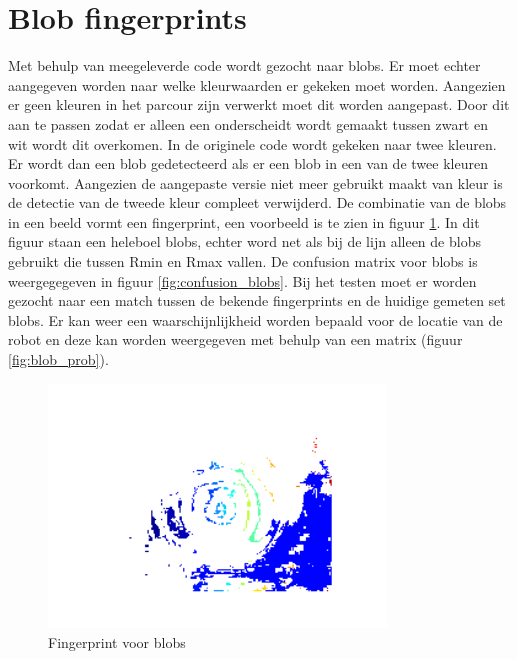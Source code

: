 \documentclass[a4paper]{article}
\begin{document}
\section{Blob fingerprints}
Met behulp van meegeleverde code wordt gezocht naar blobs. Er moet echter aangegeven worden naar welke kleurwaarden er gekeken moet worden. Aangezien er geen kleuren in het parcour zijn verwerkt moet dit worden aangepast. Door dit aan te passen zodat er alleen een onderscheidt wordt gemaakt tussen zwart en wit wordt dit overkomen. In de originele code wordt gekeken naar twee kleuren. Er wordt dan een blob gedetecteerd als er een blob in een van de twee kleuren voorkomt.  Aangezien de aangepaste versie niet meer gebruikt maakt van kleur is de detectie van de tweede kleur compleet verwijderd. 
De combinatie van de blobs in een beeld vormt een fingerprint, een voorbeeld is te zien in figuur \ref{fig:blobfinger}. In dit figuur staan een heleboel blobs, echter word net als bij de lijn alleen de blobs gebruikt die tussen Rmin en Rmax vallen. 
De confusion matrix voor blobs is weergegegeven in figuur \ref{fig:confusion_blobs}.
Bij het testen moet er worden gezocht naar een match tussen de bekende fingerprints en de huidige gemeten set blobs. Er kan weer een waarschijnlijkheid worden bepaald voor de locatie van de robot en deze kan worden weergegeven met behulp van een matrix (figuur \ref{fig:blob_prob}).
\begin{figure}[h]
	\centering
	\includegraphics[width=0.8\textwidth]{fingerprintblob.png}
	\caption{Fingerprint voor blobs}
	\label{fig:blobfinger}
\end{figure}
\end{document}
